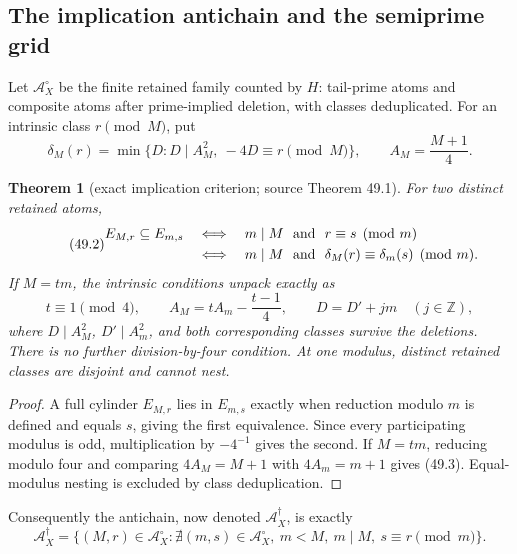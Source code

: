 \documentclass[10pt,reqno]{amsart}
\newtheorem{theorem}{Theorem}[section]
\theoremstyle{definition}
\newcommand{\1}{\mathbf 1}
\begin{document}
\subsection{The implication antichain and the semiprime grid}
\label{sec:antichain-grid}
Let $\mathcal A_X^\circ$ be the finite retained family counted by $H$:
tail-prime atoms and composite atoms after prime-implied deletion, with
classes deduplicated.  For an intrinsic class $r\pmod M$, put
\begin{equation}\tag{49.1}
 \delta_M(r)=\min\{D:D\mid A_M^2,\ -4D\equiv r\pmod M\},
 \qquad A_M=\frac{M+1}{4}.
\end{equation}

\begin{theorem}[exact implication criterion; source Theorem 49.1]
\label{thm:implication-criterion}
For two distinct retained atoms,
\begin{equation}\tag{49.2}
 \begin{aligned}
 E_{M,r}\subseteq E_{m,s}
 &\quad\Longleftrightarrow\quad
 m\mid M\ \hbox{ and }\ r\equiv s\pmod m\\
 &\quad\Longleftrightarrow\quad
 m\mid M\ \hbox{ and }\
 \delta_M(r)\equiv\delta_m(s)\pmod m.
 \end{aligned}
\end{equation}
If $M=tm$, the intrinsic conditions unpack exactly as
\begin{equation}\tag{49.3}
 t\equiv1\pmod4,\qquad
 A_M=tA_m-\frac{t-1}{4},\qquad D=D'+jm\quad(j\in\mathbb Z),
\end{equation}
where $D\mid A_M^2$, $D'\mid A_m^2$, and both corresponding classes
survive the deletions.  There is no further division-by-four condition.
At one modulus, distinct retained classes are disjoint and cannot nest.
\end{theorem}
\begin{proof}
A full cylinder $E_{M,r}$ lies in $E_{m,s}$ exactly when reduction modulo
$m$ is defined and equals $s$, giving the first equivalence.  Since every
participating modulus is odd, multiplication by $-4^{-1}$ gives the second.
If $M=tm$, reducing modulo four and comparing $4A_M=M+1$ with
$4A_m=m+1$ gives (49.3).  Equal-modulus nesting is excluded by
class deduplication.
\end{proof}
Consequently the antichain, now denoted $\mathcal A_X^\dagger$, is exactly
\begin{equation}\tag{49.4}
 \mathcal A_X^\dagger=
 \{(M,r)\in\mathcal A_X^\circ:
   \nexists(m,s)\in\mathcal A_X^\circ,
   \ m<M,\ m\mid M,\ s\equiv r\pmod m\}.
\end{equation}
\end{document}
